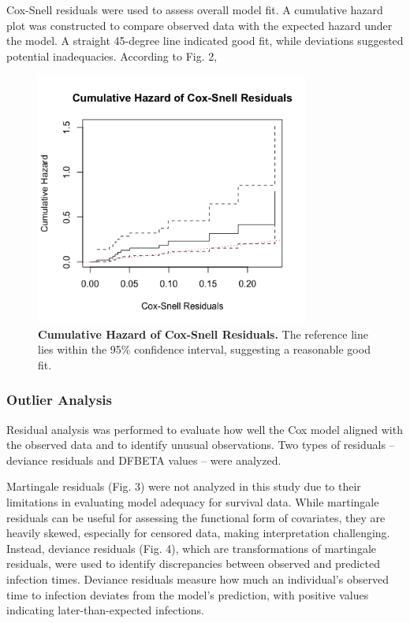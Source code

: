 \documentclass[12pt]{article}
\begin{document}
Cox-Snell residuals were used to assess overall model fit. A cumulative hazard plot was constructed to compare observed data with the expected hazard under the model. A straight 45-degree line indicated good fit, while deviations suggested potential inadequacies. According to Fig. 2, 

\begin{figure}[H]
    \centering
    \includegraphics[width=0.8\textwidth]{plots/cox_snell.png}
    \caption{\textbf{Cumulative Hazard of Cox-Snell Residuals.} The reference line lies within the 95\% confidence interval, suggesting a reasonable good fit. }
    \label{fig:km_na_curves}
\end{figure}


\subsubsection*{Outlier Analysis}

Residual analysis was performed to evaluate how well the Cox model aligned with the observed data and to identify unusual observations. Two types of residuals -- deviance residuals and DFBETA values -- were analyzed. 

Martingale residuals (Fig. 3) were not analyzed in this study due to their limitations in evaluating model adequacy for survival data. While martingale residuals can be useful for assessing the functional form of covariates, they are heavily skewed, especially for censored data, making interpretation challenging.  Instead, deviance residuals (Fig. 4), which are transformations of martingale residuals, were used to identify discrepancies between observed and predicted infection times. Deviance residuals measure how much an individual’s observed time to infection deviates from the model’s prediction, with positive values indicating later-than-expected infections. 
\end{document}
